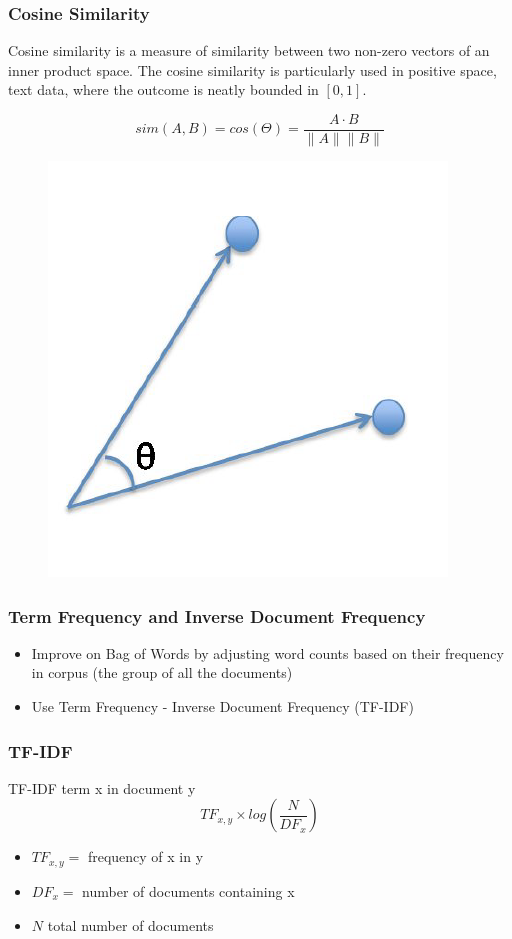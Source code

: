 \documentclass[compress, aspectratio=54]{beamer}
\begin{document}

\begin{frame}
\frametitle{Cosine Similarity}
Cosine similarity is a measure of similarity between two non-zero vectors of an inner product space.  The cosine similarity is particularly used in positive space, text data,  where the outcome is neatly bounded in $[0,1]$.

\[
sim(A, B)=cos(\Theta)= \frac{A \cdot B}{\| A \| \| B \|}
\]
\begin{figure}

\includegraphics[width=0.2\linewidth ]{Figures/cosine_sim.png}
\end{figure}
\end{frame}



\begin{frame}
\frametitle{Term Frequency and Inverse Document Frequency}
\begin{itemize}

\item Improve on Bag of Words by adjusting word
counts based on their frequency in corpus (the group of
all the documents)

\item Use Term Frequency - Inverse Document Frequency (TF-IDF)
\end{itemize}


\end{frame}


\begin{frame}
\frametitle{TF-IDF}
TF-IDF term x in document y
\[
TF_{x,y} \times log (\frac{N}{DF_x} )
\]
\begin{itemize}
\item $ TF_{x,y} =$ frequency of x in y
\item $DF_x =$ number of documents containing x
\item $N$ total number of documents
\end{itemize}

\end{frame}
\end{document}
